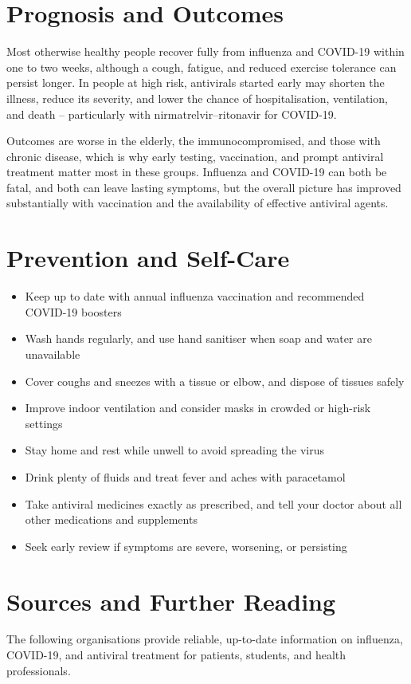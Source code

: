 \section*{Prognosis and Outcomes}
Most otherwise healthy people recover fully from influenza and COVID-19 within one to two weeks, although a cough, fatigue, and reduced exercise tolerance can persist longer. In people at high risk, antivirals started early may shorten the illness, reduce its severity, and lower the chance of hospitalisation, ventilation, and death -- particularly with nirmatrelvir--ritonavir for COVID-19.

Outcomes are worse in the elderly, the immunocompromised, and those with chronic disease, which is why early testing, vaccination, and prompt antiviral treatment matter most in these groups. Influenza and COVID-19 can both be fatal, and both can leave lasting symptoms, but the overall picture has improved substantially with vaccination and the availability of effective antiviral agents.

\section*{Prevention and Self-Care}
\begin{itemize}
    \item Keep up to date with annual influenza vaccination and recommended COVID-19 boosters
    \item Wash hands regularly, and use hand sanitiser when soap and water are unavailable
    \item Cover coughs and sneezes with a tissue or elbow, and dispose of tissues safely
    \item Improve indoor ventilation and consider masks in crowded or high-risk settings
    \item Stay home and rest while unwell to avoid spreading the virus
    \item Drink plenty of fluids and treat fever and aches with paracetamol
    \item Take antiviral medicines exactly as prescribed, and tell your doctor about all other medications and supplements
    \item Seek early review if symptoms are severe, worsening, or persisting
\end{itemize}

\section*{Sources and Further Reading}
The following organisations provide reliable, up-to-date information on influenza, COVID-19, and antiviral treatment for patients, students, and health professionals.

